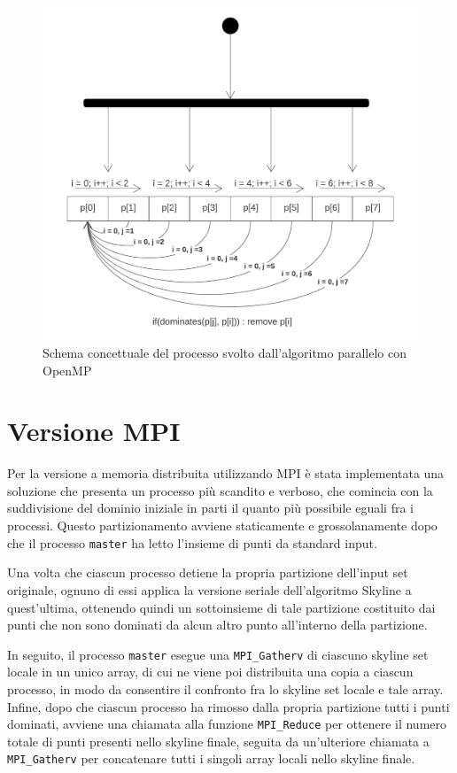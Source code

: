 \documentclass[letterpaper,11pt,leqno]{article}
\begin{document}
\begin{figure}[h]
  \centering
    \includegraphics[scale=0.4]{OMP.pdf}
    \caption{Schema concettuale del processo svolto dall'algoritmo parallelo con OpenMP}
    \label{f:graph1}
\end{figure}







\section{Versione MPI}\label{s:section}


Per la versione a memoria distribuita utilizzando MPI è stata implementata una soluzione che presenta un processo più scandito e verboso, che comincia con la suddivisione del dominio iniziale in parti il quanto più possibile eguali fra i processi. Questo partizionamento avviene staticamente e grossolanamente dopo che il processo \texttt{master} ha letto l’insieme di punti da standard input.

Una volta che ciascun processo detiene la propria partizione dell’input set originale, ognuno di essi applica la versione seriale dell’algoritmo Skyline a quest’ultima, ottenendo quindi un sottoinsieme di tale partizione costituito dai punti che non sono dominati da alcun altro punto all’interno della partizione.

In seguito, il processo \texttt{master} esegue una \texttt{MPI\_Gatherv} di ciascuno skyline set locale in un unico array, di cui ne viene poi distribuita una copia a ciascun processo, in modo da consentire il confronto fra lo skyline set locale e tale array. Infine, dopo che ciascun processo ha rimosso dalla propria partizione tutti i punti dominati, avviene una chiamata alla funzione \texttt{MPI\_Reduce} per ottenere il numero totale di punti presenti nello skyline finale, seguita da un’ulteriore chiamata a \texttt{MPI\_Gatherv} per concatenare tutti i singoli array locali nello skyline finale.
\end{document}
